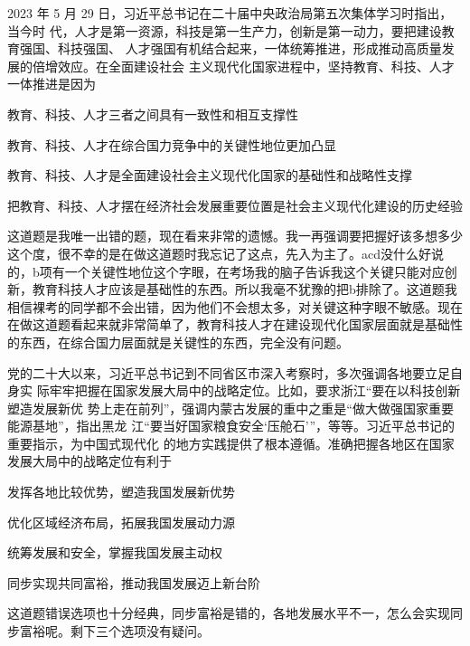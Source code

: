 \documentclass[lang=cn,newtx,10pt,scheme=chinese,pad,twocol]{zznote}
\begin{document}
\begin{exercise}2023 年 5 月 29 日，习近平总书记在二十届中央政治局第五次集体学习时指出，当今时 代，人才是第一资源，科技是第一生产力，创新是第一动力，要把建设教育强国、科技强国、 人才强国有机结合起来，一体统筹推进，形成推动高质量发展的倍增效应。在全面建设社会 主义现代化国家进程中，坚持教育、科技、人才一体推进是因为
	\begin{choice}
		\item 教育、科技、人才三者之间具有一致性和相互支撑性
		\item 教育、科技、人才在综合国力竞争中的关键性地位更加凸显
		\item 教育、科技、人才是全面建设社会主义现代化国家的基础性和战略性支撑
		\item 把教育、科技、人才摆在经济社会发展重要位置是社会主义现代化建设的历史经验
	\end{choice}
\end{exercise}
\begin{solution}
	这道题是我唯一出错的题，现在看来非常的遗憾。我一再强调要把握好该多想多少这个度，很不幸的是在做这道题时我忘记了这点，先入为主了。acd没什么好说的，b项有一个关键性地位这个字眼，在考场我的脑子告诉我这个关键只能对应创新，教育科技人才应该是基础性的东西。所以我毫不犹豫的把b排除了。这道题我相信裸考的同学都不会出错，因为他们不会想太多，对关键这种字眼不敏感。现在在做这道题看起来就非常简单了，教育科技人才在建设现代化国家层面就是基础性的东西，在综合国力层面就是关键性的东西，完全没有问题。
\end{solution}


\begin{exercise}党的二十大以来，习近平总书记到不同省区市深入考察时，多次强调各地要立足自身实 际牢牢把握在国家发展大局中的战略定位。比如，要求浙江“要在以科技创新塑造发展新优 势上走在前列”，强调内蒙古发展的重中之重是“做大做强国家重要能源基地”，指出黑龙 江“要当好国家粮食安全‘压舱石’”，等等。习近平总书记的重要指示，为中国式现代化 的地方实践提供了根本遵循。准确把握各地区在国家发展大局中的战略定位有利于
	\begin{choice}
		\item 发挥各地比较优势，塑造我国发展新优势
		\item 优化区域经济布局，拓展我国发展动力源
		\item 统筹发展和安全，掌握我国发展主动权
		\item 同步实现共同富裕，推动我国发展迈上新台阶
	\end{choice}
\end{exercise}
\begin{solution}
	这道题错误选项也十分经典，同步富裕是错的，各地发展水平不一，怎么会实现同步富裕呢。剩下三个选项没有疑问。
\end{solution}
\end{document}
